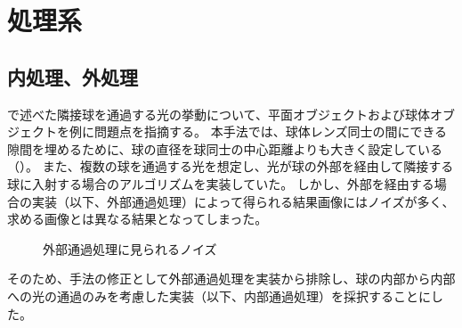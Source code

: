 \section{処理系}
\label{S}

\subsection{内処理、外処理}
\label{SSInnerOuterProcess}

で述べた隣接球を通過する光の挙動について、平面オブジェクトおよび球体オブジェクトを例に問題点を指摘する。
本手法では、球体レンズ同士の間にできる隙間を埋めるために、球の直径を球同士の中心距離よりも大きく設定している（）。
また、複数の球を通過する光を想定し、光が球の外部を経由して隣接する球に入射する場合のアルゴリズムを実装していた。
しかし、外部を経由する場合の実装（以下、外部通過処理）によって得られる結果画像にはノイズが多く、求める画像とは異なる結果となってしまった。
\begin{figure}[htbp]
  \centering
{}
  \caption{外部通過処理に見られるノイズ}
  \label{FNoise}
\end{figure}
そのため、手法の修正として外部通過処理を実装から排除し、球の内部から内部への光の通過のみを考慮した実装（以下、内部通過処理）を採択することにした。

